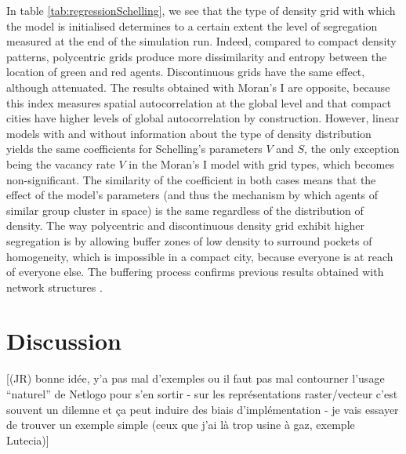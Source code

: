 \documentclass[Afour,sageh,times]{sagej}
\begin{document}
In table \ref{tab:regressionSchelling}, we see that the type of density grid with which the model is initialised determines to a certain extent the level of segregation measured at the end of the simulation run. Indeed, compared to compact density patterns, polycentric grids produce more dissimilarity and entropy between the location of green and red agents. Discontinuous grids have the same effect, although attenuated. The results obtained with Moran's I are opposite, because this index measures spatial autocorrelation at the global level and that compact cities have higher levels of global autocorrelation by construction. However, linear models with and without information about the type of density distribution yields the same coefficients for Schelling's parameters $V$ and $S$, the only exception being the vacancy rate $V$ in the Moran's I model with grid types, which becomes non-significant. The similarity of the coefficient in both cases means that the effect of the model's parameters (and thus the mechanism by which agents of similar group cluster in space) is the same regardless of the distribution of density. The way polycentric and discontinuous density grid exhibit higher segregation is by allowing buffer zones of low density to surround pockets of homogeneity, which is impossible in a compact city, because everyone is at reach of everyone else. The buffering process confirms previous results obtained with network structures \citep{Banos2012}.


\section{Discussion}



[(JR) bonne idée, y'a pas mal d'exemples ou il faut pas mal contourner l'usage ``naturel'' de Netlogo pour s'en sortir - sur les représentations raster/vecteur c'est souvent un dilemne et ça peut induire des biais d'implémentation - je vais essayer de trouver un exemple simple (ceux que j'ai là trop usine à gaz, exemple Lutecia)]

\end{document}
